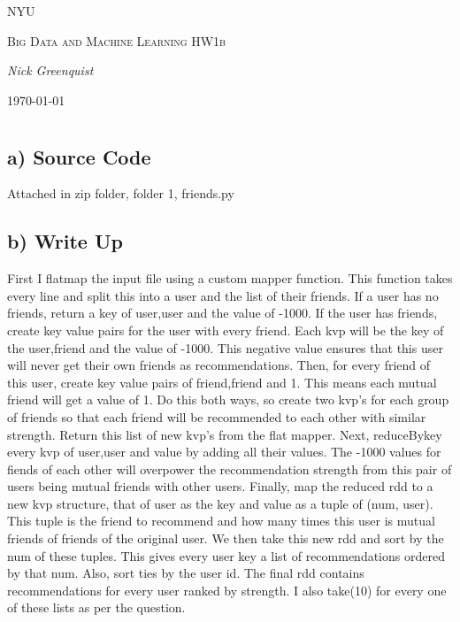 
\begin{titlepage}
    \centering
    \vfill
    {\scshape\LARGE NYU \par}
    {\scshape\Large Big Data and Machine Learning HW1b\par}
    {\Large\itshape Nick Greenquist\par}
    \vfill
    
    {\large \today\par}
\end{titlepage}

\section*{}

\subsection*{a) Source Code}
Attached in zip folder, folder 1, friends.py

\subsection*{b) Write Up}
First I flatmap the input file using a custom mapper function. This function takes every line and split this into a user and the list of their friends. If a user has no friends, return a key of user,user and the value of -1000. If the user has friends, create key value pairs for the user with every friend. Each kvp will be the key of the user,friend and the value of -1000. This negative value ensures that this user will never get their own friends as recommendations. Then, for every friend of this user, create key value pairs of friend,friend and 1. This means each mutual friend will get a value of 1. Do this both ways, so create two kvp's for each group of friends so that each friend will be recommended to each other with similar strength. Return this list of new kvp's from the flat mapper.  Next, reduceBykey every kvp of user,user and value by adding all their values. The -1000 values for fiends of each other will overpower the recommendation strength from this pair of users being mutual friends with other users. Finally, map the reduced rdd to a new kvp structure, that of user as the key and value as a tuple of (num, user). This tuple is the friend to recommend and how many times this user is mutual friends of friends of the original user. We then take this new rdd and sort by the num of these tuples. This gives every user key a list of recommendations ordered by that num. Also, sort ties by the user id. The final rdd contains recommendations for every user ranked by strength. I also take(10) for every one of these lists as per the question. 
